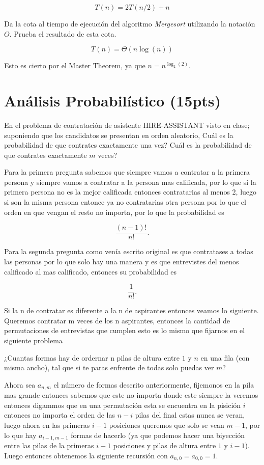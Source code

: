 \documentclass[answers,11pt]{exam}
\begin{document}
\begin{questions}
\[T(n) = 2T(n/2) + n\]

\question
Da la cota al tiempo de ejecuci\'on del algoritmo \emph{Mergesort} utilizando la notaci\'on $O$. Prueba el resultado de esta cota.

\[T(n) = \Theta(n\log(n))\]

Esto es cierto por el Master Theorem, ya que $n = n^{\log_2(2)}$.

\section*{\sf An\'alisis Probabil\'istico (15pts)}

\question
En el problema de contrataci\'on de asistente {HIRE-ASSISTANT} visto en clase; suponiendo que los candidatos se presentan en orden aleatorio, \textquestiondown Cu\'al es la probabilidad de que contrates exactamente una vez? \textquestiondown Cu\'al es la probabilidad de que contrates exactamente $m$ veces?

Para la primera pregunta sabemos que siempre vamos a contratar a la primera persona y siempre vamos a contratar a la persona mas calificada, por lo que si la primera persona no es la mejor calificada entonces contratarias al menos 2, luego si son la misma persona entonce ya no contratarias otra persona por lo que el orden en que vengan el resto no importa, por lo que la probabilidad es

\[\frac{(n-1)!}{n!}.\]

Para la segunda pregunta como venía escrito original es que contratases a todas las personas por lo que solo hay una manera y es que entrevistes del menos calificado al mas calificado, entonces su probabilidad es

\[\frac{1}{n!}.\]

Si la n de contratar es diferente a la n de aspirantes entonces veamos lo siguiente. Queremos contratar m veces de los n aspirantes, entonces la cantidad de permutaciones de entrevistas que cumplen esto es lo mismo que fijarnos en el siguiente problema

¿Cuantas formas hay de ordernar n pilas de altura entre $1$ y $n$ en una fila (con misma ancho), tal que si te paras enfrente de todas solo puedas ver $m$?

Ahora sea $a_{n,m}$ el número de formas descrito anteriormente, fijemonos en la pila mas grande entonces sabemos que este no importa donde este siempre la veremos entonces digammos que en una permutación esta se encuentra en la pisición $i$ entonces no importa el orden de las $n-i$ pilas del final estas nunca se veran, luego ahora en las primeras $i-1$ posiciones queremos que solo se vean $m-1$, por lo que hay $a_{i-1,m-1}$ formas de hacerlo (ya que podemos hacer una biyección entre las pilas de la primeras $i-1$ posiciones y pilas de altura entre $1$ y $i-1$). Luego entonces obtenemos la siguiente recursión con $a_{n,0} = a_{0,0} = 1$.


\end{questions}
\end{document}
